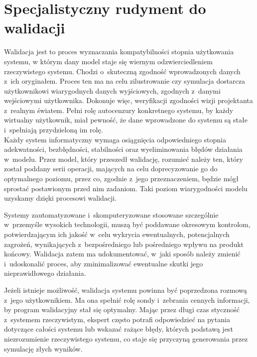 \documentclass[brudnopis]{xmgr}
\begin{document}
\section{Specjalistyczny rudyment do walidacji}

\indent \indent \indent \textcolor{sb}{Walidacja jest to proces wyznaczania kompatybilności stopnia użytkowania systemu,} \textcolor{sa}{w którym dany model staje się wiernym odzwierciedleniem rzeczywistego systemu.} \textcolor{sb}{Chodzi o~skuteczną zgodność wprowadzonych danych z~ich oryginałem.} \textcolor{sa}{Proces ten ma na celu zilustrowanie czy symulacja dostarcza użytkownikowi wiarygodnych danych wyjściowych, zgodnych z~danymi wejściowymi użytkownika. Dokonuje więc, weryfikacji zgodności wizji projektanta z~realnym światem. Pełni rolę autocenzury konkretnego systemu, by każdy wirtualny użytkownik, miał pewność, że dane wprowadzone do systemu są stałe i~spełniają przydzieloną im rolę.}
\\
\indent \textcolor{sb}{Każdy system informatyczny wymaga osiągnięcia odpowiedniego stopnia adekwatności, bezbłędności, stabilności oraz wyeliminowania błędów działania w~modelu}. \textcolor{sa}{Przez model, który przeszedł walidację, rozumieć należy ten, który został poddany serii operacji,} \textcolor{sa}{mających na celu doprecyzowanie go do optymalnego poziomu, przez co, zgodnie z~jego przeznaczeniem, będzie mógł sprostać postawionym przed nim zadaniom. Taki poziom wiarygodności modelu uzyskamy dzięki procesowi walidacji.}

\textcolor{sb}{Systemy zautomatyzowane i~skomputeryzowane stosowane szczególnie w~przemyśle wysokich technologii, muszą być poddawane okresowym kontrolom,} \textcolor{sa}{potwierdzającym ich jakość w~celu wykrycia ewentualnych, potencjalnych zagrożeń, wynikających z~bezpośredniego lub pośredniego wpływu na produkt końcowy. Walidacja zatem ma udokumentować, w~jaki sposób należy zmienić i~udoskonalić proces, aby zminimalizować ewentualne skutki jego nieprawidłowego działania.}

\textcolor{sb}{Jeżeli istnieje możliwość, walidacja systemu powinna być poprzedzona rozmową z~jego użytkownikiem.} \textcolor{sa}{Ma ona spełnić rolę sondy i~zebrania cennych informacji, by program walidacyjny stał się optymalny.} \textcolor{sb}{Mając przez długi czas styczność z~systemem rzeczywistym, ekspert często potrafi odpowiedzieć na pytania dotyczące całości systemu lub wskazać rażące błędy,} \textcolor{sa}{których podstawą jest niezrozumienie rzeczywistego systemu, co staje się przyczyną generowania przez symulację złych wyników.} \cite{Validation}
\end{document}
